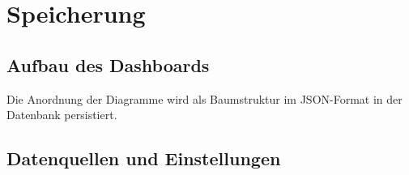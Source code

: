 \section{Speicherung}
\label{sec:speicherung}

\subsection{Aufbau des Dashboards}
\label{subsec:aufbaudesdashboards}
Die Anordnung der Diagramme wird als Baumstruktur im JSON-Format in der Datenbank persistiert.

\subsection{Datenquellen und Einstellungen}
\label{subsec:datenquellenundeinstellungen}
